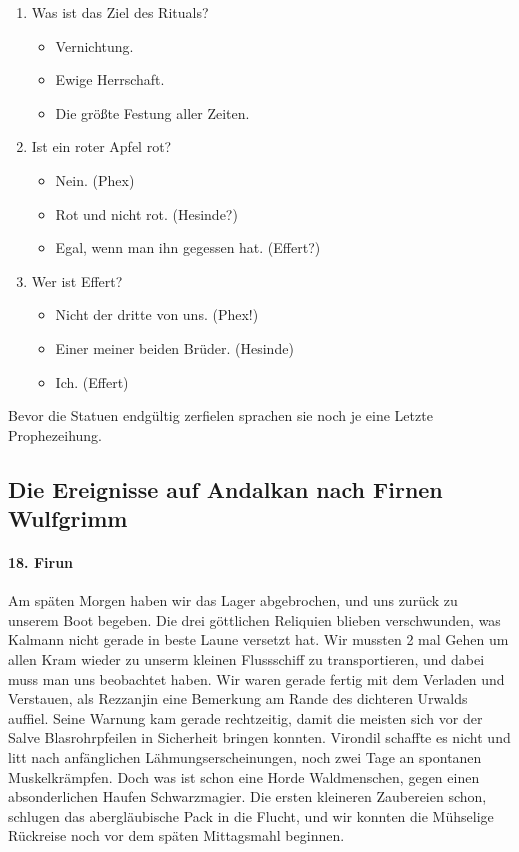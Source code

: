 \begin{enumerate}
\begin{itemize}
\end{itemize}
\item Was ist das Ziel des Rituals?
\begin{itemize}
\item Vernichtung.
\item Ewige Herrschaft.
\item Die größte Festung aller Zeiten.
\end{itemize}
\item Ist ein roter Apfel rot?
\begin{itemize}
\item Nein. (Phex)
\item Rot und nicht rot. (Hesinde?)
\item Egal, wenn man ihn gegessen hat. (Effert?)
\end{itemize}
\item Wer ist Effert?
\begin{itemize}
\item Nicht der dritte von uns. (Phex!)
\item Einer meiner beiden Brüder. (Hesinde)
\item Ich. (Effert)
\end{itemize}
\end{enumerate}
Bevor die Statuen endgültig zerfielen sprachen sie noch je eine Letzte Prophezeihung.

\subsection{Die Ereignisse auf Andalkan nach Firnen Wulfgrimm}

\paragraph{18. Firun}
Am späten Morgen haben wir das Lager abgebrochen, und uns zurück zu unserem Boot begeben. Die drei göttlichen Reliquien blieben verschwunden, was Kalmann nicht gerade in beste Laune versetzt hat. Wir mussten 2 mal Gehen um allen Kram wieder zu unserm kleinen Flussschiff zu transportieren, und dabei muss man uns beobachtet haben. Wir waren gerade fertig mit dem Verladen und Verstauen, als Rezzanjin eine Bemerkung am Rande des dichteren Urwalds auffiel. Seine Warnung kam gerade rechtzeitig, damit die meisten sich vor der Salve Blasrohrpfeilen in Sicherheit bringen konnten. Virondil schaffte es nicht und litt nach anfänglichen Lähmungserscheinungen, noch zwei Tage an spontanen Muskelkrämpfen. Doch was ist schon eine Horde Waldmenschen, gegen einen absonderlichen Haufen Schwarzmagier. Die ersten kleineren Zaubereien schon, schlugen das abergläubische Pack in die Flucht, und wir konnten die Mühselige Rückreise noch vor dem späten Mittagsmahl beginnen.

